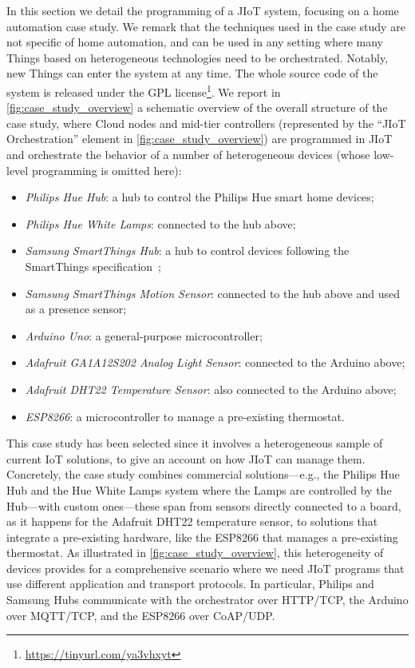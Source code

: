 In this section we detail the programming of a JIoT system, focusing on a home
automation case study. We remark that the techniques used in the case study
are not specific of home automation, and can be used in any setting where many
Things based on heterogeneous technologies need to be orchestrated. Notably,
new Things can enter the system at any time. The whole source code of the
system is released under the GPL license\footnote{\url{https://tinyurl.com/ya3vhxyt}}.
We report in \cref{fig:case_study_overview} a schematic overview of the
overall structure of the case study, where Cloud nodes and mid-tier
controllers (represented by the ``JIoT Orchestration'' element in
\cref{fig:case_study_overview}) are programmed in JIoT and orchestrate the
behavior of a number of heterogeneous devices (whose low-level programming is
omitted here):
\begin{itemize}
  \item \emph{Philips Hue Hub}: a hub to control the Philips Hue smart home devices;
  \item \emph{Philips Hue White Lamps}: connected to the hub above;
  \item \emph{Samsung SmartThings Hub}: a hub to control devices following 
  the SmartThings specification~\cite{60};
  \item \emph{Samsung SmartThings Motion Sensor}: connected to the hub above 
  and used as a presence sensor;
  \item \emph{Arduino Uno}: a general-purpose microcontroller;
  \item \emph{Adafruit GA1A12S202 Analog Light Sensor}: connected to the 
  Arduino above;
  \item \emph{Adafruit DHT22 Temperature Sensor}: also connected to the 
  Arduino above;
  \item \emph{ESP8266}: a microcontroller to manage a pre-existing 
  thermostat.
\end{itemize}
This case study has been selected since it involves a heterogeneous
sample of current IoT solutions, to give an account on how JIoT can
manage them.  Concretely, the case study combines commercial
solutions---e.g., the Philips Hue Hub and the Hue White Lamps system
where the Lamps are controlled by the Hub---with custom ones---these
span from sensors directly connected to a board, as it happens for the
Adafruit DHT22 temperature sensor, to solutions that integrate a
pre-existing hardware, like the ESP8266 that manages a pre-existing
thermostat. As illustrated in \cref{fig:case_study_overview}, this
heterogeneity of devices provides for a comprehensive scenario where
we need JIoT programs that use different application and transport
protocols. In particular, Philips and Samsung Hubs communicate with
the orchestrator over HTTP/TCP, the Arduino over MQTT/TCP, and the
ESP8266 over CoAP/UDP.


